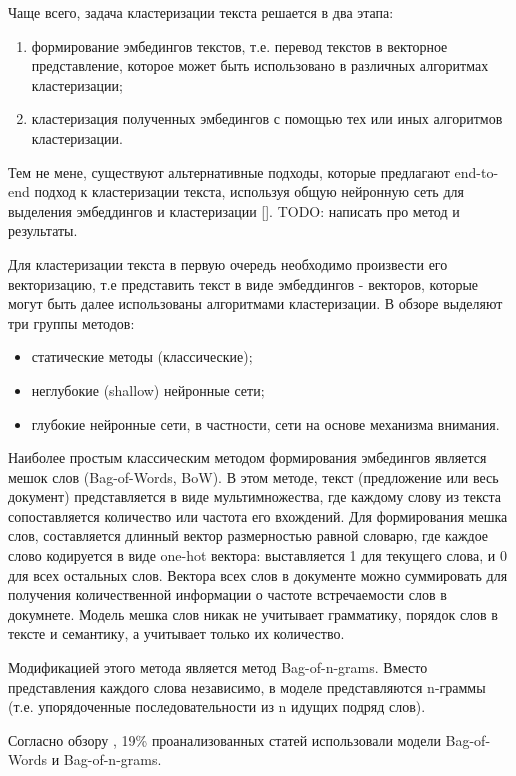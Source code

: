 Чаще всего, задача кластеризации текста решается в два этапа:
\begin{enumerate}
    \item формирование эмбедингов текстов, т.е. перевод текстов в векторное представление, которое может быть использовано в различных алгоритмах кластеризации;
    \item кластеризация полученных эмбедингов с помощью тех или иных алгоритмов кластеризации.
\end{enumerate}

Тем не мене, существуют альтернативные подходы, которые предлагают end-to-end подход к кластеризации текста, используя общую нейронную сеть для выделения эмбеддингов и кластеризации [\cite{end-to-end-clustering}]. TODO: написать про метод и результаты.

Для кластеризации текста в первую очередь необходимо произвести его векторизацию, т.е представить текст в виде эмбеддингов - векторов, которые могут быть далее использованы алгоритмами кластеризации. В обзоре \cite{no-patterns} выделяют три группы методов:
\begin{itemize}
    \item статические методы (классические);
    \item неглубокие (shallow) нейронные сети;
    \item глубокие нейронные сети, в частности, сети на основе механизма внимания.
\end{itemize}

Наиболее простым классическим методом формирования эмбедингов является мешок слов (Bag-of-Words, BoW). В этом методе, текст (предложение или весь документ) представляется в виде мультимножества, где каждому слову из текста сопоставляется количество или частота его вхождений. Для формирования мешка слов, составляется длинный вектор размерностью равной словарю, где каждое слово кодируется в виде one-hot вектора: выставляется 1 для текущего слова, и 0 для всех остальных слов. Вектора всех слов в документе можно суммировать для получения количественной информации о частоте встречаемости слов в докумнете. Модель мешка слов никак не учитывает грамматику, порядок слов в тексте и семантику, а учитывает только их количество.

Модификацией этого метода является метод Bag-of-n-grams. Вместо представления каждого слова независимо, в моделе представляются n-граммы (т.е. упорядоченные последовательности из n идущих подряд слов).

Согласно обзору \cite{no-patterns}, 19\% проанализованных статей использовали модели Bag-of-Words и Bag-of-n-grams.


